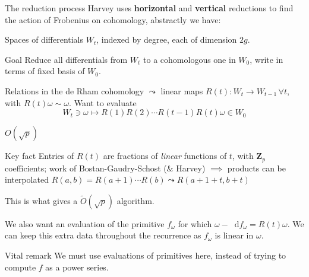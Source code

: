 \documentclass[notheorems]{beamer}
\theoremstyle{plain}
\theoremstyle{definition}
\theoremstyle{definition}
\theoremstyle{definition}
\newcommand{\term}[1]{\textbf{#1}}
\newcommand{\diff}{\mathop{}\!\mathrm{d}}
\newcommand{\ZZ}{\mathbf{Z}}
\begin{document}
\begin{frame}{The reduction process}
    Harvey uses \term{horizontal} and \term{vertical} reductions to find the action of Frobenius on cohomology, \pause%
    abstractly we have:

    Spaces of differentials \(W_t\), indexed by degree, each of dimension \(2g\).
    \begin{block}{Goal} Reduce all differentials from \(W_t\) to a cohomologous one in \(W_0\), write in terms of fixed basis of \(W_0\).\end{block}
    \pause%
    Relations in the de Rham cohomology \(\leadsto\) linear maps \(R(t)\colon W_t \to W_{t-1}\,\forall t\), with \(R(t) \omega \sim \omega\).
    \pause%
    Want to evaluate
    \[W_t \ni \omega \mapsto R(1) R(2) \cdots R(t-1)R(t) \omega \in W_0\]

\end{frame}

\begin{frame}{\(O(\sqrt p)\)}
    \begin{alertblock}{Key fact}
        Entries of \(R(t)\) are fractions of \emph{linear} functions of \(t\), with \(\ZZ_p\) coefficients; work of Bostan-Gaudry-Schost (\& Harvey) $\implies$ products can be interpolated
        \(R(a,b) = R(a+1) \cdots R(b)\leadsto R(a+1+t,b+t)\)
    \end{alertblock}
    This is what gives a \(\widetilde O(\sqrt p)\) algorithm.

    \pause%
    We also want an evaluation of the primitive \(f_{\omega}\) for which \(\omega - \diff f_{\omega} = R(t)\omega\).
    We can keep this extra data throughout the recurrence as \(f_{\omega}\) is linear in \(\omega\).

    \pause%
    \begin{block}{Vital remark}
        We must use evaluations of primitives here, instead of trying to compute \(f\) as a power series.
    \end{block}

\end{frame}
\end{document}
